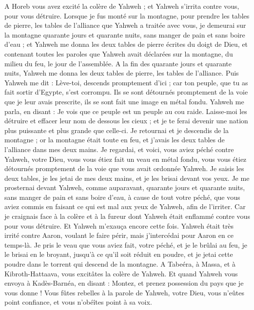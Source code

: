 \begin{multicols}{2}
A Horeb vous avez excité la colère de Yahweh ; et Yahweh s'irrita contre vous, pour vous détruire.
Lorsque je fus monté sur la montagne, pour prendre les tables de pierre, les tables de l'alliance que Yahweh a traitée avec vous, je demeurai sur la montagne quarante jours et quarante nuits, sans manger de pain et sans boire d'eau ;
et Yahweh me donna les deux tables de pierre écrites du doigt de Dieu, et contenant toutes les paroles que Yahweh avait déclarées sur la montagne, du milieu du feu, le jour de l'assemblée.
A la fin des quarante jours et quarante nuits, Yahweh me donna les deux tables de pierre, les tables de l'alliance.
Puis Yahweh me dit : Lève-toi, descends promptement d'ici ; car ton peuple, que tu as fait sortir d'Egypte, s'est corrompu. Ils se sont détournés promptement de la voie que je leur avais prescrite, ils se sont fait une image en métal fondu.
Yahweh me parla, en disant : Je vois que ce peuple est un peuple au cou raide.
Laisse-moi les détruire et effacer leur nom de dessous les cieux ; et je te ferai devenir une nation plus puissante et plus grande que celle-ci.
Je retournai et je descendis de la montagne ; or la montagne était toute en feu, et j'avais les deux tables de l'alliance dans mes deux mains.
Je regardai, et voici, vous aviez péché contre Yahweh, votre Dieu, vous vous étiez fait un veau en métal fondu, vous vous étiez détournés promptement de la voie que vous avait ordonnée Yahweh.
Je saisis les deux tables, je les jetai de mes deux mains, et je les brisai devant vos yeux.
Je me prosternai devant Yahweh, comme auparavant, quarante jours et quarante nuits, sans manger de pain et sans boire d'eau, à cause de tout votre péché, que vous aviez commis en faisant ce qui est mal aux yeux de Yahweh, afin de l'irriter.
Car je craignais face à la colère et à la fureur dont Yahweh était enflammé contre vous pour vous détruire. Et Yahweh m'exauça encore cette fois.
Yahweh était très irrité contre Aaron, voulant le faire périr, mais j'intercédai pour Aaron en ce temps-là.
Je pris le veau que vous aviez fait, votre péché, et je le brûlai au feu, je le brisai en le broyant, jusqu'à ce qu'il soit réduit en poudre, et je jetai cette poudre dans le torrent qui descend de la montagne.
A Tabeéra, à Massa, et à Kibroth-Hattaava, vous excitâtes la colère de Yahweh.
Et quand Yahweh vous envoya à Kadès-Barnéa, en disant : Montez, et prenez possession du pays que je vous donne ! Vous fûtes rebelles à la parole de Yahweh, votre Dieu, vous n'eûtes point confiance, et vous n'obéîtes point à sa voix.

\end{multicols}
